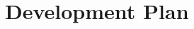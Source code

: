\documentclass[11pt,letterpaper]{article}
\begin{document}

\section{Development Plan} \label{s:plan}


\end{document}
